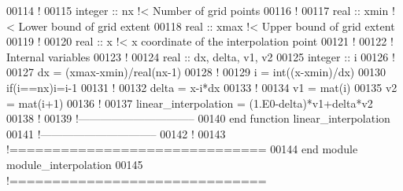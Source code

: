 \begin{DoxyCode}
00114 \textcolor{comment}{!}
00115 \textcolor{keywordtype}{integer} :: nx \textcolor{comment}{!< Number of grid points }
00116 \textcolor{comment}{!}
00117 \textcolor{keywordtype}{real} :: xmin \textcolor{comment}{!< Lower bound of grid extent }
00118 \textcolor{keywordtype}{real} :: xmax \textcolor{comment}{!< Upper bound of grid extent}
00119 \textcolor{comment}{!}
00120 \textcolor{keywordtype}{real} :: x \textcolor{comment}{!< x coordinate of the interpolation point }
00121 \textcolor{comment}{!}
00122 \textcolor{comment}{! Internal variables}
00123 \textcolor{comment}{!}
00124 \textcolor{keywordtype}{real} :: dx, delta, v1, v2
00125 \textcolor{keywordtype}{integer} :: i
00126 \textcolor{comment}{!}
00127 dx = (xmax-xmin)/\textcolor{keywordtype}{real}(nx-1)
00128 \textcolor{comment}{!}
00129 i = int((x-xmin)/dx)
00130 \textcolor{keyword}{if}(i==nx)i=i-1
00131 \textcolor{comment}{!}
00132 delta = x-i*dx
00133 \textcolor{comment}{!}
00134 v1 = mat(i)
00135 v2 = mat(i+1)
00136 \textcolor{comment}{!}
00137 linear\_interpolation = (1.E0-delta)*v1+delta*v2
00138 \textcolor{comment}{! }
00139 \textcolor{comment}{!--------------------------------}
00140 \textcolor{keyword}{end function linear\_interpolation}
00141 \textcolor{comment}{!--------------------------------}
00142 \textcolor{comment}{!}
00143 \textcolor{comment}{!==============================}
00144 \textcolor{keyword}{end module module\_interpolation}
00145 \textcolor{comment}{!==============================}
\end{DoxyCode}
